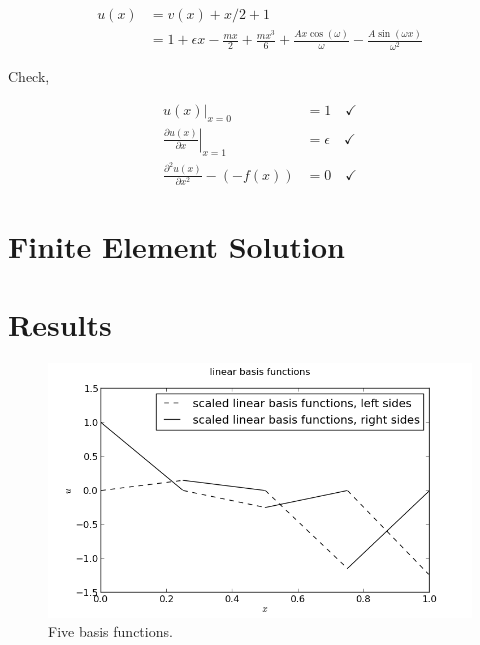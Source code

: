 \documentclass[10pt]{article}
\begin{document}
\begin{equation}
\label{eqn:u(x)}
 \begin{split}
  u(x) &= v(x) + x/2 + 1 \\
  &= 1 + \epsilon x - \frac{m x}{2} + \frac{m x^3}{6} + \frac{A x \cos(\omega)}{\omega} -
   \frac{A \sin(\omega x)}{\omega^2}
 \end{split}
\end{equation}

Check, 

\begin{equation}
 \begin{split}
  \left. u(x) \right|_{x=0} &= 1 \quad \checkmark \\
  \left. \frac{\partial u(x)}{\partial x} \right|_{x=1} &= \epsilon \quad \checkmark \\
  \frac{\partial^2 u(x)}{\partial x^2} - (-f(x)) &= 0 \quad \checkmark
 \end{split}
\end{equation}
    
\section{Finite Element Solution}
\label{sec:FE_work}

\section{Results}
\label{sec:results}

\begin{figure}[ht]
 \centering
 \includegraphics[width=\columnwidth,keepaspectratio=true]{./hw7-basis_functions-N5.png}
 \caption{Five basis functions.}
 \label{fig:N5}
\end{figure}
\end{document}
